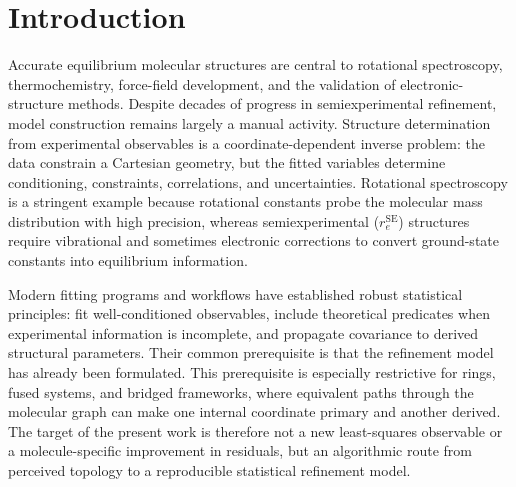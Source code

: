 \documentclass[aip,jcp,reprint,longbibliography,floatfix]{revtex4-2}
\begin{document}
\begin{abstract}
\end{abstract}


\maketitle


\section{Introduction}

Accurate equilibrium molecular structures are central to rotational
spectroscopy, thermochemistry, force-field development, and the validation of
electronic-structure methods.\cite{Demaison2011EquilibriumStructures,PuzzariniStanton2023}
Despite decades of progress in semiexperimental refinement, model construction
remains largely a manual activity. Structure determination from experimental
observables is a coordinate-dependent inverse problem: the data constrain a
Cartesian geometry, but the fitted variables determine conditioning,
constraints, correlations, and uncertainties. Rotational spectroscopy is a
stringent example because rotational constants probe the molecular mass
distribution with high precision, whereas semiexperimental
($r_e^{\mathrm{SE}}$) structures require vibrational and sometimes electronic
corrections to convert ground-state constants into equilibrium
information.\cite{Costain1958,Pawlowski2002,Piccardo2015B3LYP,Penocchio2015B2PLYP}

Modern fitting programs and workflows\cite{Mendolicchio2017MSR,KisielPROSPE,Kanzow2025PCCP}
have established robust statistical principles: fit well-conditioned
observables, include theoretical predicates when experimental information is
incomplete, and propagate covariance to derived structural
parameters.\cite{Bartell1975Predicate} Their common prerequisite is that the
refinement model has already been formulated. This prerequisite is especially
restrictive for rings, fused systems, and bridged frameworks, where equivalent
paths through the molecular graph can make one internal coordinate primary and
another derived. The target of the present work is therefore not a new
least-squares observable or a molecule-specific improvement in residuals, but
an algorithmic route from perceived topology to a reproducible statistical
refinement model.
\end{document}
